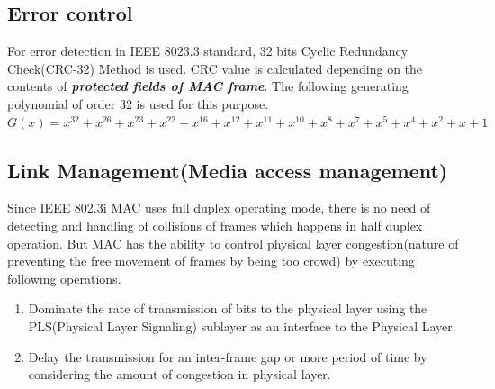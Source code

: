 \documentclass[a4paper,11pt]{article}%
\begin{document}

\subsection{Error control}

For error detection in IEEE 8023.3 standard, 32 bits Cyclic Redundancy Check(CRC-32) Method is used. CRC value is calculated depending on the contents of \textit{\textbf{protected fields of MAC frame}}. The following generating polynomial of order 32 is used for this purpose.\\

$ G(x) =  x^{32} + x^{26} + x^{23} + x^{22} + x^{16} + x^{12} + x^{11} + x^{10} + x^8 + x^7 + x^5 + x^4 + x^2 + x + 1$

\subsection{Link Management(Media access management)}%

Since IEEE 802.3i MAC uses full duplex operating mode, there is no need of detecting and handling of collisions of frames which happens in half duplex operation. But MAC has the ability to control physical layer congestion(nature of preventing the free movement of frames by being too crowd) by executing following operations.
\begin{enumerate}
	\item Dominate the rate of transmission of bits to the physical layer using the PLS(Physical Layer Signaling) sublayer as an interface to the  Physical Layer.
	\item Delay the transmission for an inter-frame gap or  more period of time by considering the amount of congestion in physical layer.
\end{enumerate} \\[1cm]
\end{document}
